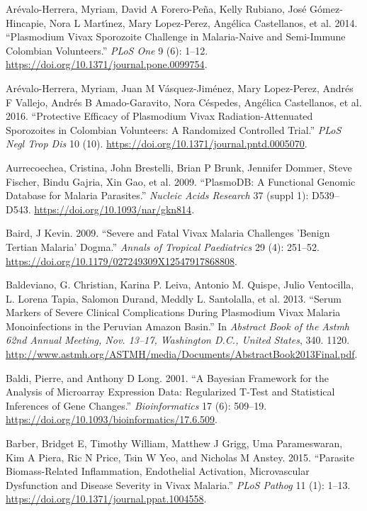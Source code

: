 \documentclass[
  a4paper]{article}
\begin{document}
\leavevmode\hypertarget{ref-arevalo2014}{}%
Arévalo-Herrera, Myriam, David A Forero-Peña, Kelly Rubiano, José
Gómez-Hincapie, Nora L Martı́nez, Mary Lopez-Perez, Angélica Castellanos,
et al. 2014. ``Plasmodium Vivax Sporozoite Challenge in Malaria-Naive
and Semi-Immune Colombian Volunteers.'' \emph{PLoS One} 9 (6): 1--12.
\url{https://doi.org/10.1371/journal.pone.0099754}.

\leavevmode\hypertarget{ref-arevalo2016spz}{}%
Arévalo-Herrera, Myriam, Juan M Vásquez-Jiménez, Mary Lopez-Perez,
Andrés F Vallejo, Andrés B Amado-Garavito, Nora Céspedes, Angélica
Castellanos, et al. 2016. ``Protective Efficacy of Plasmodium Vivax
Radiation-Attenuated Sporozoites in Colombian Volunteers: A Randomized
Controlled Trial.'' \emph{PLoS Negl Trop Dis} 10 (10).
\url{https://doi.org/10.1371/journal.pntd.0005070}.

\leavevmode\hypertarget{ref-plasmodb}{}%
Aurrecoechea, Cristina, John Brestelli, Brian P Brunk, Jennifer Dommer,
Steve Fischer, Bindu Gajria, Xin Gao, et al. 2009. ``PlasmoDB: A
Functional Genomic Database for Malaria Parasites.'' \emph{Nucleic Acids
Research} 37 (suppl 1): D539--D543.
\url{https://doi.org/10.1093/nar/gkn814}.

\leavevmode\hypertarget{ref-baird2009}{}%
Baird, J Kevin. 2009. ``Severe and Fatal Vivax Malaria Challenges
'Benign Tertian Malaria' Dogma.'' \emph{Annals of Tropical Paediatrics}
29 (4): 251--52. \url{https://doi.org/10.1179/027249309X12547917868808}.

\leavevmode\hypertarget{ref-baldevi2013}{}%
Baldeviano, G. Christian, Karina P. Leiva, Antonio M. Quispe, Julio
Ventocilla, L. Lorena Tapia, Salomon Durand, Meddly L. Santolalla, et
al. 2013. ``Serum Markers of Severe Clinical Complications During
Plasmodium Vivax Malaria Monoinfections in the Peruvian Amazon Basin.''
In \emph{Abstract Book of the Astmh 62nd Annual Meeting, Nov. 13--17,
Washington D.C., United States}, 340. 1120.
\url{http://www.astmh.org/ASTMH/media/Documents/AbstractBook2013Final.pdf}.

\leavevmode\hypertarget{ref-baldi2001cybert}{}%
Baldi, Pierre, and Anthony D Long. 2001. ``A Bayesian Framework for the
Analysis of Microarray Expression Data: Regularized T-Test and
Statistical Inferences of Gene Changes.'' \emph{Bioinformatics} 17 (6):
509--19. \url{https://doi.org/10.1093/bioinformatics/17.6.509}.

\leavevmode\hypertarget{ref-barber2015}{}%
Barber, Bridget E, Timothy William, Matthew J Grigg, Uma Parameswaran,
Kim A Piera, Ric N Price, Tsin W Yeo, and Nicholas M Anstey. 2015.
``Parasite Biomass-Related Inflammation, Endothelial Activation,
Microvascular Dysfunction and Disease Severity in Vivax Malaria.''
\emph{PLoS Pathog} 11 (1): 1--13.
\url{https://doi.org/10.1371/journal.ppat.1004558}.
\end{document}
